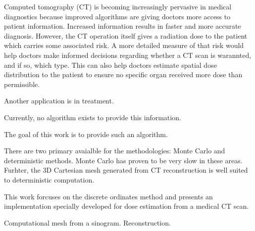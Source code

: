 

Computed tomography (CT) is becoming increasingly pervasive in medical diagnostics because improved algorithms are giving doctors more access to patient information. Increased information results in faster and more accurate diagnosis. However, the CT operation itself gives a radiation dose to the patient which carries some associated risk. A more detailed measure of that risk would help doctors make informed decisions regarding whether a CT scan is warannted, and if so, which type. This can also help doctors estimate spatial dose distribution to the patient to ensure no specific organ received more dose than permissible.

Another application is in treatment.

Currently, no algorithm exists to provide this information.

The goal of this work is to provide such an algorithm.

There are two primary avaialble for the methodologies: Monte Carlo and deterministic methods. Monte Carlo has proven to be very slow in these areas. Furhter, the 3D Cartesian mesh generated from CT reconstruction is well suited to deterministic computation. 

This work forcuses on the discrete ordinates method and presents an implementation specially developed for dose estimation from a medical CT scan. 

Computational mesh from a sinogram. Reconstruction.

\endinput
